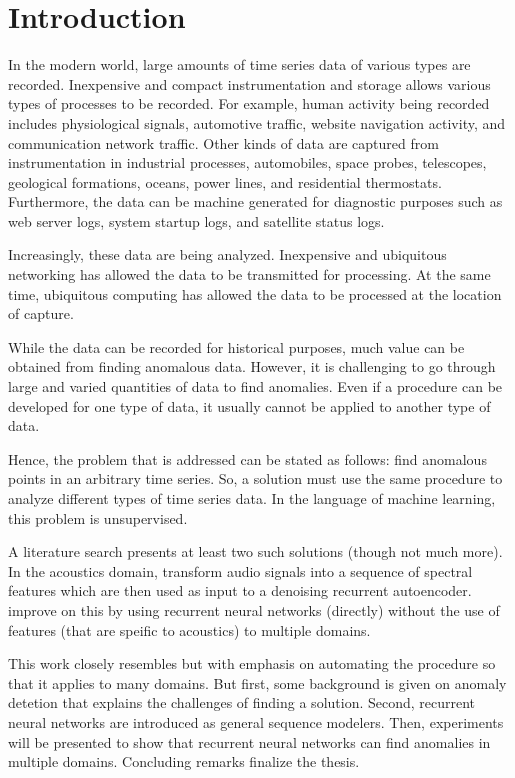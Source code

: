 

\chapter[Introduction]{Introduction}


In the modern world, large amounts of time series data of various types are recorded.  Inexpensive and compact instrumentation and storage allows various types of processes to be recorded. For example, human activity being recorded includes physiological signals, automotive traffic, website navigation activity, and communication network traffic. Other kinds of data are captured from instrumentation in industrial processes, automobiles, space probes, telescopes, geological formations, oceans, power lines, and residential thermostats. Furthermore, the data can be machine generated for diagnostic purposes such as web server logs, system startup logs, and satellite status logs.

Increasingly, these data are being analyzed. Inexpensive and ubiquitous networking has allowed the data to be transmitted for processing. At the same time, ubiquitous computing has allowed the data to be processed at the location of capture.

While the data can be recorded for historical purposes, much value can be obtained from finding anomalous data. However, it is challenging to go through large and varied quantities of data to find anomalies. Even if a procedure can be developed for one type of data, it usually cannot be applied to another type of data.

Hence, the problem that is addressed can be stated as follows: find anomalous points in an arbitrary time series. So, a solution must use the same procedure to analyze different types of time series data. In the language of machine learning, this problem is unsupervised.

A literature search presents at least two such solutions (though not much more). In the acoustics domain, \cite{Marchi2015} transform audio signals into a sequence of spectral features which are then used as input to a denoising recurrent autoencoder. \cite{Malhotra2015} improve on this by using recurrent neural networks (directly) without the use of features (that are speific to acoustics) to multiple domains.

This work closely resembles \cite{Malhotra2015} but with emphasis on automating the procedure so that it applies to many domains. But first, some background is given on anomaly detetion that explains the challenges of finding a solution. Second, recurrent neural networks are introduced as general sequence modelers. Then, experiments will be presented to show that recurrent neural networks can find anomalies in multiple domains. Concluding remarks finalize the thesis.

